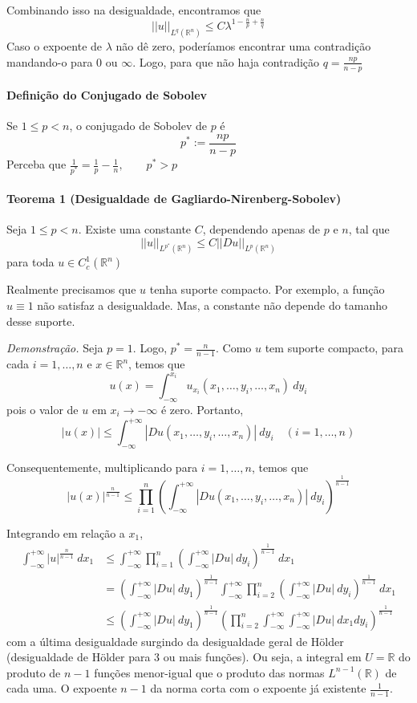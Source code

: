 \documentclass[a4paper, 11pt]{article}
\newcommand{\R}{\mathbb{R}}
\newcommand{\Rn}{{\mathbb{R}^n}}
\newcommand{\nor}[2]{||#1||_{#2}}
\begin{document}
Combinando isso na desigualdade, encontramos que \[ \nor{u}{L^q(\Rn)} \leq C \lambda^{1 - \frac{n}{p} + \frac{n}{q} }\] Caso o expoente de $\lambda$ não dê zero, poderíamos encontrar uma contradição mandando-o para 0 ou $\infty$. Logo, para que não haja contradição $ q = \frac{np}{n-p} $

\paragraph{Definição do Conjugado de Sobolev} Se $ 1\leq p < n $, o conjugado de Sobolev de $p$ é \[ p^* := \frac{np}{n-p} \] Perceba que $ \frac{1}{p^*} = \frac{1}{p} - \frac{1}{n}, \qquad p^* > p $


\paragraph{Teorema 1 (Desigualdade de Gagliardo-Nirenberg-Sobolev)}\label{t:sobolev-ineq-t1} Seja $ 1 \leq p < n $. Existe uma constante $C$, dependendo apenas de $p$ e $n$, tal que \[ ||u||_{L^{p^*}(\Rn)} \leq C \left|\left|Du\right|\right|_{L^{p}(\Rn)} \] para toda $u \in C^1_c(\Rn)$

Realmente precisamos que $u$ tenha suporte compacto. Por exemplo, a função $u \equiv 1$ não satisfaz a desigualdade. Mas, a constante não depende do tamanho desse suporte.

\textit{Demonstração.} Seja $p=1$. Logo, $p^* = \frac{n}{n-1}$. Como $u$ tem suporte compacto, para cada $i=1,\ldots,n$ e $x \in \Rn$, temos que \[ u(x) = \int_{-\infty}^{x_i} u_{x_i}(x_1, \ldots, y_i, \ldots, x_n) \ dy_i\] pois o valor de $u$ em $x_i \rightarrow -\infty$ é zero. Portanto, \[ |u(x)| \leq \int_{-\infty}^{+\infty} \left| Du(x_1, \ldots, y_i, \ldots, x_n) \right|\ dy_i \quad (i=1, \ldots, n)\]

Consequentemente, multiplicando para $i=1, \ldots, n$, temos que \[ |u(x)|^{\frac{n}{n-1}} \leq \prod_{i=1}^{n} \left( \int_{-\infty}^{+\infty} |Du(x_1, \ldots, y_i, \ldots, x_n)| \ dy_i \right)^{\frac{1}{n-1}}  \]

Integrando em relação a $x_1$, \begin{align*}
	\int_{-\infty}^{+\infty} |u|^{\frac{n}{n-1}}\ dx_1 &\leq \int_{-\infty}^{+\infty} \prod_{i=1}^{n} \left( \int_{-\infty}^{+\infty} |Du|\ dy_i \right)^{\frac{1}{n-1}}\ dx_1 \\
	&= \left( \int_{-\infty}^{+\infty} |Du|\ dy_1 \right)^{\frac{1}{n-1}} \int_{-\infty}^{+\infty} \prod_{i=2}^{n} \left( \int_{-\infty}^{+\infty} |Du|\ dy_i \right)^{\frac{1}{n-1}}\ dx_1 \\
	&\leq \left( \int_{-\infty}^{+\infty} |Du|\ dy_1 \right)^{\frac{1}{n-1}}  \left( \prod_{i=2}^{n} \int_{-\infty}^{+\infty} \int_{-\infty}^{+\infty} |Du|\ dx_1 dy_i \right)^{\frac{1}{n-1}} 
\end{align*} com a última desigualdade surgindo da desigualdade geral de Hölder (desigualdade de Hölder para 3 ou mais funções). Ou seja, a integral em $U=\R$ do produto de $n-1$ funções menor-igual que o produto das normas $L^{n-1}(\R)$  de cada uma. O expoente $n-1$ da norma corta com o expoente já existente \( \frac{1}{n-1} \).
\end{document}
